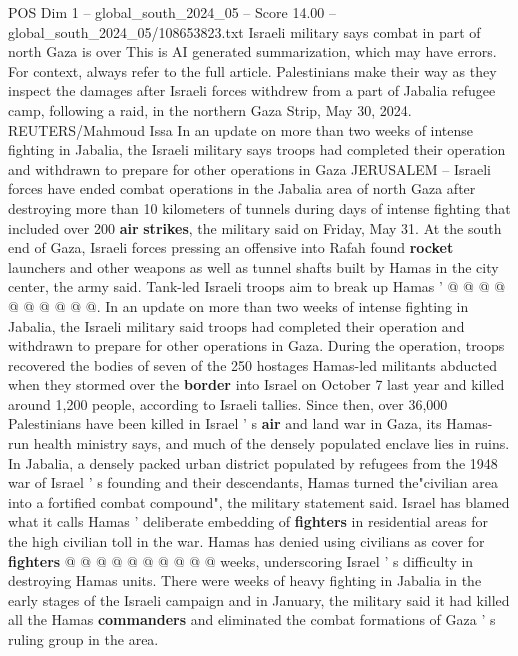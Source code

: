 \begin{textsample}{POS Dim 1 – global\_south\_2024\_05 – Score 14.00 – global\_south\_2024\_05/108653823.txt}  \label{ex:f1_pos_247}
Israeli military says combat in part of north Gaza is over This is AI generated summarization, which may have errors.
For context, always refer to the full article.
Palestinians make their way as they inspect the damages after Israeli forces withdrew from a part of Jabalia refugee camp, following a raid, in the northern Gaza Strip, May 30, 2024.
REUTERS/Mahmoud Issa In an update on more than two weeks of intense fighting in Jabalia, the Israeli military says troops had completed their operation and withdrawn to prepare for other operations in Gaza JERUSALEM -- Israeli forces have ended combat operations in the Jabalia area of north Gaza after destroying more than 10 kilometers of tunnels during days of intense fighting that included over 200 \textbf{air} \textbf{strikes}, the military said on Friday, May 31.
At the south end of Gaza, Israeli forces pressing an offensive into Rafah found \textbf{rocket} launchers and other weapons as well as tunnel shafts built by Hamas in the city center, the army said.
Tank-led Israeli troops aim to break up Hamas ' @ @ @ @ @ @ @ @ @ @.
In an update on more than two weeks of intense fighting in Jabalia, the Israeli military said troops had completed their operation and withdrawn to prepare for other operations in Gaza.
During the operation, troops recovered the bodies of seven of the 250 hostages Hamas-led militants abducted when they stormed over the \textbf{border} into Israel on October 7 last year and killed around 1,200 people, according to Israeli tallies.
Since then, over 36,000 Palestinians have been killed in Israel ' s \textbf{air} and land war in Gaza, its Hamas-run health ministry says, and much of the densely populated enclave lies in ruins.
In Jabalia, a densely packed urban district populated by refugees from the 1948 war of Israel ' s founding and their descendants, Hamas turned the"civilian area into a fortified combat compound", the military statement said.
Israel has blamed what it calls Hamas ' deliberate embedding of \textbf{fighters} in residential areas for the high civilian toll in the war.
Hamas has denied using civilians as cover for \textbf{fighters} @ @ @ @ @ @ @ @ @ @ weeks, underscoring Israel ' s difficulty in destroying Hamas units.
There were weeks of heavy fighting in Jabalia in the early stages of the Israeli campaign and in January, the military said it had killed all the Hamas \textbf{commanders} and eliminated the combat formations of Gaza ' s ruling group in the area.

\end{textsample}

